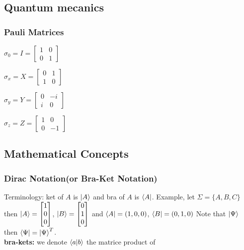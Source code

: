 \documentclass[5pt]{article}
\begin{document}
\begin{multicols}{3}
\subsection{Quantum mecanics}
\subsubsection{Pauli Matrices}
\begin{itemize*}
     \item $\sigma_0 = I = \begin{bmatrix}1 & 0 \\ 0 & 1\end{bmatrix}$
     \item $\sigma_x = X = \begin{bmatrix}0 & 1 \\ 1 & 0\end{bmatrix}$
     \item $\sigma_y = Y = \begin{bmatrix}0 & -i \\ i & 0\end{bmatrix}$
     \item $\sigma_z = Z = \begin{bmatrix}1 & 0 \\ 0 & -1\end{bmatrix}$
\end{itemize*}









\newpage

\subsection{Mathematical Concepts}

\subsubsection{Dirac Notation\footnotesize{(or Bra-Ket Notation)}}
Terminology: ket of $A$ is $\ket{A}$ and bra of $A$ is $\bra{A}$.
Example, let $\Sigma=\{A,B,C\}$ then $\ket{A}=\begin{bmatrix}1\\0\\0 \end{bmatrix}$, $\ket{B}=\begin{bmatrix}0\\1\\0 \end{bmatrix}$
and $\bra{A}=(1,0,0)$, $\bra{B}=(0,1,0)$
Note that $\ket{\Psi}$ then $\bra{\Psi}=\ket{\Psi}^T$.\\
\textbf{bra-kets:} we denote $\braket{a}{b}$ the matrice product of 



\end{multicols}
\end{document}
